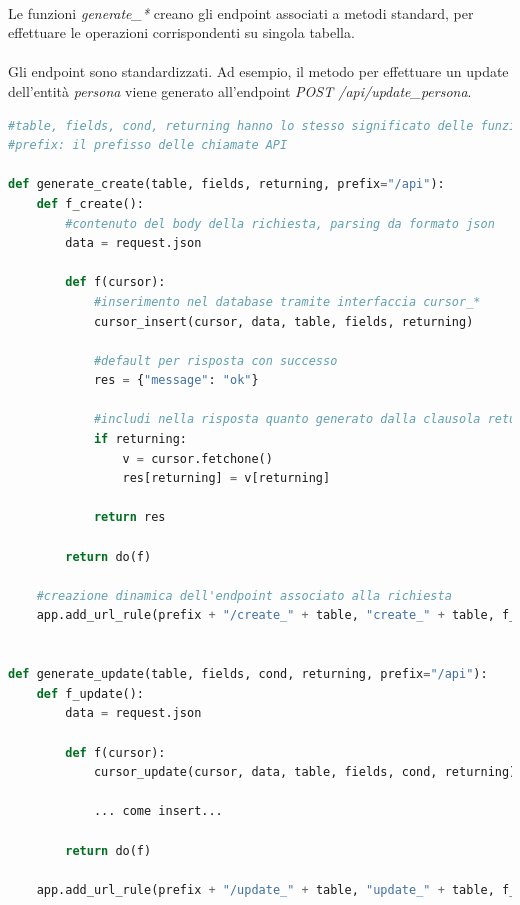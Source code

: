 \documentclass[12pt,a4paper,twoside,english,italian]{book}
\begin{document}
\paragraph{} Le funzioni \emph{generate\_*} creano gli endpoint associati a metodi standard, per effettuare le operazioni corrispondenti su singola tabella. 

\paragraph{} Gli endpoint sono standardizzati. Ad esempio, il metodo per effettuare un update dell'entità \emph{persona} viene generato all'endpoint \emph{POST /api/update\_persona}. 

\begin{lstlisting}[language=python, caption=Funzioni \emph{generate\_*}]
#table, fields, cond, returning hanno lo stesso significato delle funzioni cursor_*
#prefix: il prefisso delle chiamate API

def generate_create(table, fields, returning, prefix="/api"):
    def f_create():
        #contenuto del body della richiesta, parsing da formato json
        data = request.json

        def f(cursor):
            #inserimento nel database tramite interfaccia cursor_*
            cursor_insert(cursor, data, table, fields, returning)

            #default per risposta con successo
            res = {"message": "ok"}

            #includi nella risposta quanto generato dalla clausola returning
            if returning:  
                v = cursor.fetchone()
                res[returning] = v[returning]

            return res

        return do(f)

    #creazione dinamica dell'endpoint associato alla richiesta
    app.add_url_rule(prefix + "/create_" + table, "create_" + table, f_create, methods=["POST"])
    

def generate_update(table, fields, cond, returning, prefix="/api"):
    def f_update():
        data = request.json

        def f(cursor):
            cursor_update(cursor, data, table, fields, cond, returning)

            ... come insert...

        return do(f)

    app.add_url_rule(prefix + "/update_" + table, "update_" + table, f_update, methods=["POST"])



\end{lstlisting}
\end{document}

